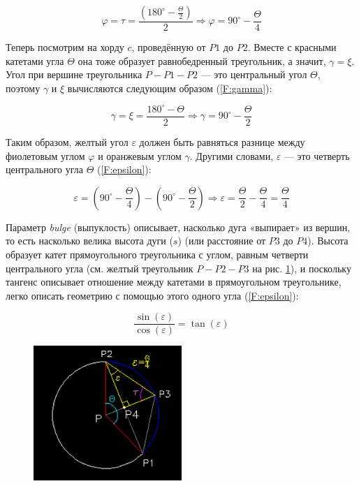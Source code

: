 \begin{equation}
	\varphi=\tau=\frac{(180^{\circ}-\frac{\Theta}{2})}{2}\Rightarrow\varphi=90^{\circ}-\frac{\Theta}{4}
	\label{F:phi}
\end{equation}

Теперь посмотрим на хорду $c$, проведённую от $P1$ до $P2$. Вместе с красными катетами угла $\Theta$ она тоже образует равнобедренный треугольник, а значит, $\gamma=\xi$. Угол при вершине треугольника $P-P1-P2$ --- это центральный угол $\Theta$, поэтому $\gamma$ и $\xi$ вычисляются следующим образом (\ref{F:gamma}):

\begin{equation}
	\gamma=\xi=\frac{180^{\circ}-\Theta}{2}\Rightarrow\gamma=90^{\circ}-\frac{\Theta}{2}
	\label{F:gamma}
\end{equation}

Таким образом, желтый угол $\varepsilon$ должен быть равняться разнице между фиолетовым углом $\varphi$ и оранжевым углом $\gamma$. Другими словами, $\varepsilon$ --- это четверть центрального угла $\Theta$ (\ref{F:epsilon}):

\begin{equation}
	\varepsilon=(90^{\circ}-\frac{\Theta}{4})-(90^{\circ}-\frac{\Theta}{2})\Rightarrow\varepsilon=\frac{\Theta}{2}-\frac{\Theta}{4}=\frac{\Theta}{4}
	\label{F:epsilon}
\end{equation}

Параметр \textit{bulge} (выпуклость) описывает, насколько дуга «выпирает» из вершин, то есть насколько велика высота дуги ($s$) (или расстояние от $P3$ до $P4$). Высота образует катет прямоугольного треугольника с углом, равным четверти центрального угла (см. желтый треугольник $P-P2-P3$ на рис. \ref{fig:epsilon}), и поскольку тангенс описывает отношение между катетами в прямоугольном треугольнике, легко описать геометрию с помощью этого одного угла (\ref{F:epsilon}):

\begin{equation}
	\frac{\sin(\varepsilon)}{\cos(\varepsilon)}=\tan(\varepsilon)
	\label{F:epsilon}
\end{equation}

\begin{figure}[H]
	\centering
	\includegraphics[width=0.5\textwidth]{figures/epsilon.png}
	\label{fig:epsilon}
\end{figure}

